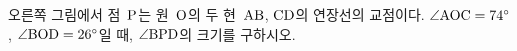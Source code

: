 \noindent\begin{minipage}[t]{0.58\linewidth}\vspace{0pt}\raggedright 오른쪽 그림에서 점~$\mathrm{P}$는 원~$\mathrm{O}$의 두 현~$\mathrm{AB}$, $\mathrm{CD}$의 연장선의 교점이다. $\angle\mathrm{AOC}=74^\circ$, $\angle\mathrm{BOD}=26^\circ$일 때, $\angle\mathrm{BPD}$의 크기를 구하시오.\end{minipage}\hfill\begin{minipage}[t]{0.4\linewidth}\vspace{0pt}\centering \resizebox{\ifdim\width>\linewidth\linewidth\else\width\fi}{!}{}\end{minipage}\par
